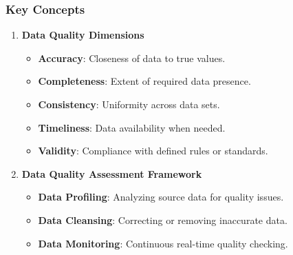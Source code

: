 \documentclass{beamer}
\begin{document}
\begin{frame}[fragile]
    \frametitle{Key Concepts}
    \begin{enumerate}
        \item \textbf{Data Quality Dimensions}
        \begin{itemize}
            \item \textbf{Accuracy}: Closeness of data to true values.
            \item \textbf{Completeness}: Extent of required data presence.
            \item \textbf{Consistency}: Uniformity across data sets.
            \item \textbf{Timeliness}: Data availability when needed.
            \item \textbf{Validity}: Compliance with defined rules or standards.
        \end{itemize}
    
        \item \textbf{Data Quality Assessment Framework}
        \begin{itemize}
            \item \textbf{Data Profiling}: Analyzing source data for quality issues.
            \item \textbf{Data Cleansing}: Correcting or removing inaccurate data.
            \item \textbf{Data Monitoring}: Continuous real-time quality checking.
        \end{itemize}
    \end{enumerate}
\end{frame}
\end{document}
